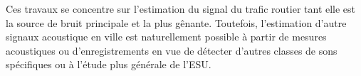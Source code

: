Ces travaux se concentre sur l'estimation du signal du trafic routier tant elle est la source de bruit principale et la plus gênante. Toutefois, l'estimation d'autre signaux acoustique en ville est naturellement possible à partir de mesures acoustiques ou d'enregistrements en vue de détecter d'autres classes de sons spécifiques ou à l'étude plus générale de l'ESU.




%
%
